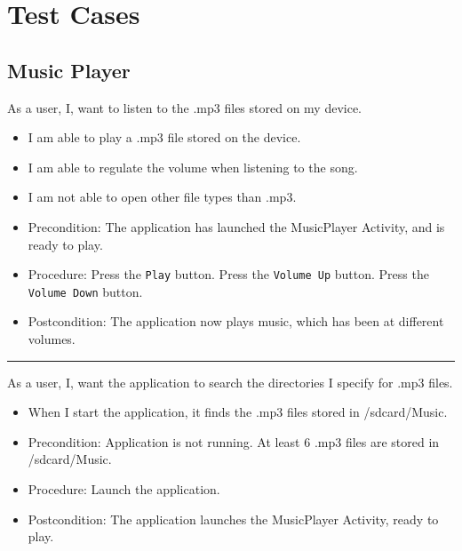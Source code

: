 \section{Test Cases}
\subsection{Music Player}
{As a user, I, want to listen to the .mp3 files stored on my device.}
{\begin{itemize}
\item I am able to play a .mp3 file stored on the device.
\item I am able to regulate the volume when listening to the song.
\item I am not able to open other file types than .mp3.
\end{itemize}}

\begin{itemize}
\item Precondition: 
\subitem The application has launched the MusicPlayer Activity, and is ready to play.

\item Procedure:
\subitem Press the \texttt{Play} button.
\subitem Press the \texttt{Volume Up} button.
\subitem Press the \texttt{Volume Down} button.

\item Postcondition:
\subitem The application now plays music, which has been at different volumes.
\end{itemize}

\rule{\textwidth}{1pt}

{As a user, I, want the application to search the directories I specify for .mp3 files.}
{\begin{itemize}
\item When I start the application, it finds the .mp3 files stored in /sdcard/Music.
\end{itemize}}

\begin{itemize}
\item Precondition: 
\subitem Application is not running.
\subitem At least 6 .mp3 files are stored in /sdcard/Music.

\item Procedure:
\subitem Launch the application.

\item Postcondition:
\subitem The application launches the MusicPlayer Activity, ready to play.
\end{itemize}

